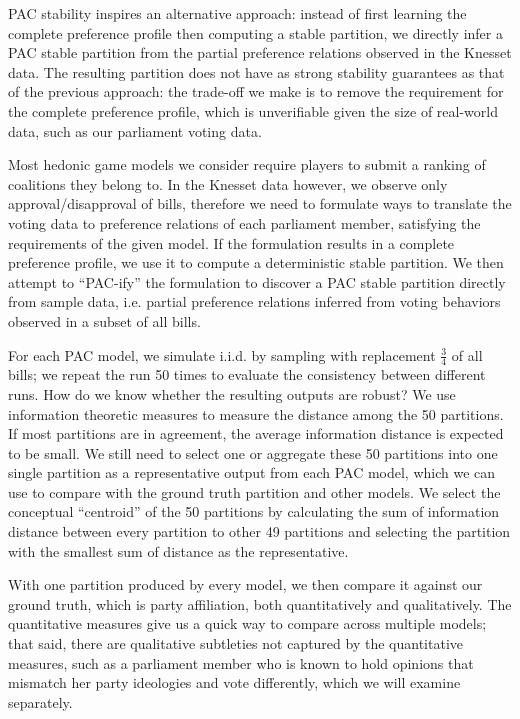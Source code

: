 PAC stability inspires an alternative approach: instead of first learning the complete preference profile then computing a stable partition, we directly
infer a PAC stable partition from the partial preference relations observed in the Knesset data.
The resulting partition does not have as strong stability guarantees as that
of the previous approach: the trade-off we make is to remove the requirement for
the complete preference profile, which is unverifiable given the size of
real-world data, such as our parliament voting data.

Most hedonic game models we consider require players to submit a ranking of
coalitions they belong to. 
In the Knesset data however, we observe only approval/disapproval of bills,
therefore we need to formulate ways to translate the voting data to preference 
relations of each parliament member, satisfying the requirements of the given 
model.
If the formulation results in a complete preference profile, we use it to
compute a deterministic stable partition.
We then attempt to ``PAC-ify'' the formulation to discover a PAC stable partition
directly from sample data, i.e. partial preference relations inferred from
voting behaviors observed in a subset of all bills.

For each PAC model, we simulate i.i.d. by sampling with replacement 
$\frac{3}{4}$ of all bills; we repeat the run 50 times to evaluate the
consistency between different runs.
How do we know whether the resulting outputs are robust?
We use information theoretic measures to measure the distance among the 50
partitions.
If most partitions are in agreement, the average information distance is
expected to be small.
We still need to select one or aggregate these 50 partitions into one single
partition as a representative output from each PAC model, which we can use
to compare with the ground truth partition and other models.
We select the conceptual ``centroid'' of the 50 partitions by calculating
the sum of information distance between every partition to other 49 partitions
and selecting the partition with the smallest sum of distance as the
representative.

With one partition produced by every model, we then compare it against our
ground truth, which is party affiliation, both quantitatively and qualitatively.
The quantitative measures give us a quick way to compare across multiple models;
that said, there are qualitative subtleties not captured by the quantitative
measures, such as a parliament member who is known to hold opinions that
mismatch her party ideologies and vote differently, which we will examine
separately.

